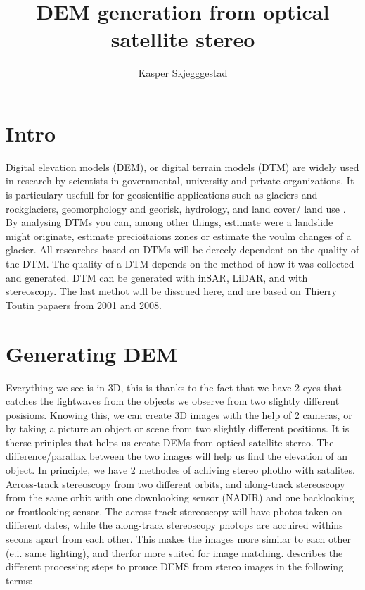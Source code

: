 \documentclass[a4paper,UKenglish]{article}
\title{DEM generation from optical satellite stereo}
\author{Kasper Skjegggestad}
\begin{document}
\maketitle
\tableofcontents

\section{Intro}

Digital elevation models (DEM), or digital terrain models (DTM) are widely used in research by scientists in governmental, university and private organizations. It is particulary usefull for for geosientific applications such as glaciers and rockglaciers, geomorphology and georisk, hydrology, and land cover/ land use \citep{toutin08}. By analysing DTMs you can, among other things, estimate were a landslide might originate, estimate precioitaions zones or estimate the voulm changes of a glacier. All researches based on DTMs will be derecly dependent on the quality of the DTM. The quality of a DTM depends on the method of how it was collected and generated. DTM can be generated with inSAR, LiDAR, and with stereoscopy. The last methot will be disscued here, and are based on Thierry Toutin papaers from 2001 and 2008.

\section{Generating DEM}
Everything we see is in 3D, this is thanks to the fact that we have 2 eyes that catches the lightwaves from the objects we observe from two slightly different posisions. Knowing this, we can create 3D images with the help of 2 cameras, or by taking a picture an object or scene from two slightly different positions. It is therse priniples that helps us create DEMs from optical satellite stereo. The difference/parallax between the two images will help us find the elevation of an object. In principle, we have 2 methodes of achiving stereo photho with satalites. Across-track stereoscopy from two different orbits, and along-track stereoscopy from the same orbit with one downlooking sensor (NADIR) and one backlooking or frontlooking sensor. The across-track stereoscopy will have photos taken on different dates, while the along-track stereoscopy photops are accuired withins secons apart from each other. This makes the images more similar to each other (e.i. same lighting), and therfor more suited for image matching.
\cite{toutin01} describes the different processing steps to prouce DEMS from stereo images in the following terms: 
\end{document}
